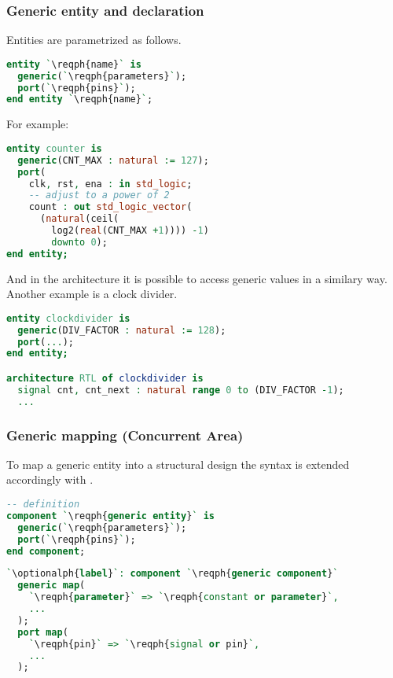 \subsubsection{Generic entity and declaration}
Entities are parametrized as follows.
\begin{lstlisting}[language=vhdl]
entity `\reqph{name}` is
  generic(`\reqph{parameters}`);
  port(`\reqph{pins}`);
end entity `\reqph{name}`;
\end{lstlisting}
For example:
\begin{lstlisting}[language=vhdl]
entity counter is
  generic(CNT_MAX : natural := 127);
  port(
    clk, rst, ena : in std_logic;
    -- adjust to a power of 2
    count : out std_logic_vector(
      (natural(ceil(
        log2(real(CNT_MAX +1)))) -1)
        downto 0);
end entity;
\end{lstlisting}
And in the architecture it is possible to access generic values in a similary
way. Another example is a clock divider.
\begin{lstlisting}[language=vhdl]
entity clockdivider is
  generic(DIV_FACTOR : natural := 128);
  port(...);
end entity;

architecture RTL of clockdivider is
  signal cnt, cnt_next : natural range 0 to (DIV_FACTOR -1);
  ...
\end{lstlisting}

\subsubsection{Generic mapping (Concurrent Area)}
To map a generic entity into a structural design the syntax is extended
accordingly with .
\begin{lstlisting}[language=vhdl]
-- definition
component `\reqph{generic entity}` is
  generic(`\reqph{parameters}`);
  port(`\reqph{pins}`);
end component;
\end{lstlisting}
\begin{lstlisting}[language=vhdl]
`\optionalph{label}`: component `\reqph{generic component}`
  generic map(
    `\reqph{parameter}` => `\reqph{constant or parameter}`,
    ...
  );
  port map(
    `\reqph{pin}` => `\reqph{signal or pin}`, 
    ...
  );

\end{lstlisting}

